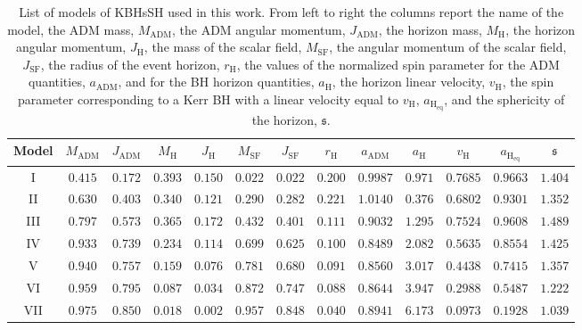 \documentclass[twocolumn,aps,showpacs,showkeys,prd,superscriptaddress,byrevtex, amsmath]{revtex4-1}
\begin{document}
\begin{table}
\caption{List of models of KBHsSH used in this work. From left to right the columns report the name of the model, the ADM mass, $M_{\mathrm{ADM}}$, the ADM angular momentum, $J_{\mathrm{ADM}}$, the horizon mass, $M_{\mathrm{H}}$, the horizon angular momentum, $J_{\mathrm{H}}$, the mass of the scalar field, $M_{\mathrm{SF}}$, the angular momentum of the scalar field, $J_{\mathrm{SF}}$, the radius of the event horizon, $r_{\mathrm{H}}$, the values of the normalized spin parameter for the ADM quantities, $a_{\mathrm{ADM}}$, and for the BH horizon quantities, $a_{\mathrm{H}}$, the horizon linear velocity, $v_{\mathrm{H}}$, the spin parameter corresponding to a Kerr BH with a linear velocity equal to $v_{\mathrm{H}}$, $a_{\mathrm{H_{eq}}}$, and the sphericity of the horizon, $\mathfrak{s}$.}        
\label{models_list}      
\centering          
\begin{tabular}{c c c c  c c c c   c c c c c}
\hline\hline       
 Model & $M_{\mathrm{ADM}}$ & $J_{\mathrm{ADM}}$ & $M_{\mathrm{H}}$ &  $J_{\mathrm{H}}$ & $M_{\mathrm{SF}}$ & $J_{\mathrm{SF}}$ & $r_{\mathrm{H}}$ & $a_{\mathrm{ADM}}$ & $a_{\mathrm{H}}$ & $v_{\mathrm{H}}$ & $a_{\mathrm{H_{eq}}}$ & $\mathfrak{s}$\\ 
\hline           
I & $0.415$ & $0.172$ & $0.393$ &  $0.150$  & $0.022$ & $0.022$ & $0.200$ & $0.9987$ & $0.971$ & $0.7685$ & $0.9663$ & $1.404$\\ 
 \hline 
II & $0.630$ & $0.403$ & $0.340$ &  $0.121$  & $0.290$ & $0.282$ & $0.221$ & $1.0140$ & $0.376$ & $0.6802$ & $0.9301$ & $1.352$ \\
 \hline 
III & $0.797$ & $0.573$ & $0.365$ &  $0.172$  & $0.432$ & $0.401$ & $0.111$ & $0.9032$ & $1.295$ & $0.7524$ & $0.9608$ & $1.489$ \\ 
 \hline 
IV & $0.933$ & $0.739$ & $0.234$ &  $0.114$  & $0.699$ & $0.625$ & $0.100$ & $0.8489$ & $2.082$ & $0.5635$ & $0.8554$ & $1.425$ \\ 
 \hline 
V & $0.940$ & $0.757$ & $0.159$ &  $0.076$  & $0.781$ & $0.680$ & $0.091$ & $0.8560$ & $3.017$ & $0.4438$ & $0.7415$ & $1.357$ \\ 
 \hline 
VI & $0.959$ & $0.795$ & $0.087$ &  $0.034$  & $0.872$ & $0.747$ & $0.088$ & $0.8644$ & $3.947$ & $0.2988$ & $0.5487$ & $1.222$ \\ 
 \hline 
VII & $0.975$ & $0.850$ & $0.018$ &  $0.002$  & $0.957$ & $0.848$ & $0.040$ & $0.8941$ & $6.173$ & $0.0973$ & $0.1928$ & $1.039$ \\ 
\hline      
\end{tabular}
\end{table}
\end{document}

